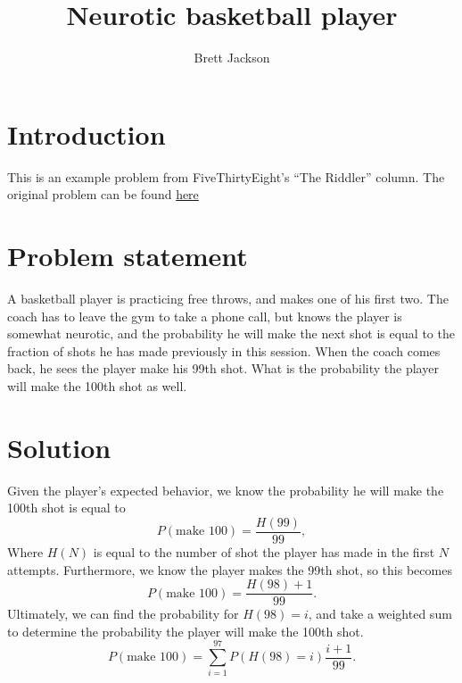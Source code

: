 \documentclass[12]{article}
\title{Neurotic basketball player}
\author{Brett Jackson}
\begin{document}
\maketitle
\section{Introduction}
This is an example problem from FiveThirtyEight's ``The Riddler'' column.
The original problem can be found \href{http://fivethirtyeight.com/features/will-the-neurotic-basketball-player-make-his-next-free-throw/}{here}

\section{Problem statement}
A basketball player is practicing free throws, and makes one of his first two.
The coach has to leave the gym to take a phone call, but knows the player
is somewhat neurotic, and the probability he will make the next shot is equal
to the fraction of shots he has made previously in this session.
When the coach comes back, he sees the player make his 99th shot.
What is the probability the player will make the 100th shot as well.

\section{Solution}
Given the player's expected behavior, we know the probability he will make the
100th shot is equal to
\begin{equation}
  P(\text{make 100}) = \frac{H(99)}{99},
\end{equation}
Where $H(N)$ is equal to the number of shot the player has made in the first $N$
attempts.
Furthermore, we know the player makes the 99th shot, so this becomes
\begin{equation}
  P(\text{make 100}) = \frac{H(98)+1}{99}.
\end{equation}
Ultimately, we can find the probability for $H(98)=i$, and take a weighted sum
to determine the probability the player will make the 100th shot.
\begin{equation}
  P(\text{make 100}) =
  \sum_{i=1}^{97}P\left(H\left(98\right)=i\right)\frac{i+1}{99}.
\end{equation}
\end{document}
